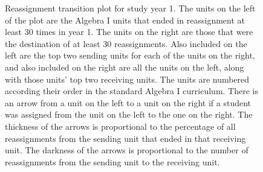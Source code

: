 \documentclass[notitlepage,12pt]{jedm}\usepackage[]{graphicx}\usepackage[]{color}
\begin{document}
\begin{figure}
\begin{subfigure}{1in}
\end{subfigure}
\caption{Reassignment transition plot for study year 1. The units on
  the left of the plot are the Algebra I units that ended in reassignment at
  least 30 times in year 1. The units on the right are those that were
  the destination of at least 30 reassignments. Also included on the
  left are the top two sending units for each of the units on the
  right, and also included on the right are all the units on the left,
  along with those units' top two receiving units. The units are numbered
  according their order in the standard Algebra I curriculum. There is an arrow from a
  unit on the left to a unit on the right if a student was assigned
  from the unit on the left to the one on the right. The thickness of
  the arrows is proportional to the percentage of all reassignments from
  the sending unit that ended in that receiving unit. The darkness of
  the arrows is proportional to the number of reassignments from the
  sending unit to the receiving unit.}
\label{fig:trans1}
\end{figure}
\end{document}
